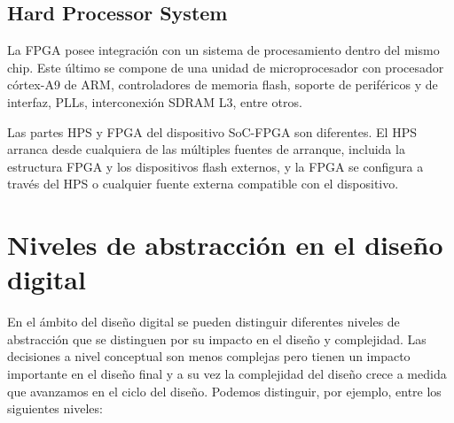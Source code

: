 \subsection{Hard Processor System}
La FPGA posee integración con un sistema de procesamiento dentro del mismo chip. Este último se compone de una unidad de microprocesador con procesador córtex-A9 de ARM, controladores de memoria flash, soporte de periféricos y de interfaz, PLLs, interconexión SDRAM L3, entre otros.

Las partes HPS y FPGA del dispositivo SoC-FPGA son diferentes. El HPS arranca desde cualquiera de las múltiples fuentes de arranque, incluida la estructura FPGA y los dispositivos flash externos, y la FPGA se configura a través del HPS o cualquier fuente externa compatible con el dispositivo.





\section{Niveles de abstracción en el diseño digital}

En el ámbito del diseño digital se pueden distinguir diferentes niveles de abstracción \citep{niveles_abstraccion} que se distinguen por su impacto en el diseño y complejidad. Las decisiones a nivel conceptual son menos complejas pero tienen un impacto importante en el diseño final y a su vez la complejidad del diseño crece a medida que avanzamos en el ciclo del diseño. Podemos distinguir, por ejemplo, entre los siguientes niveles:


